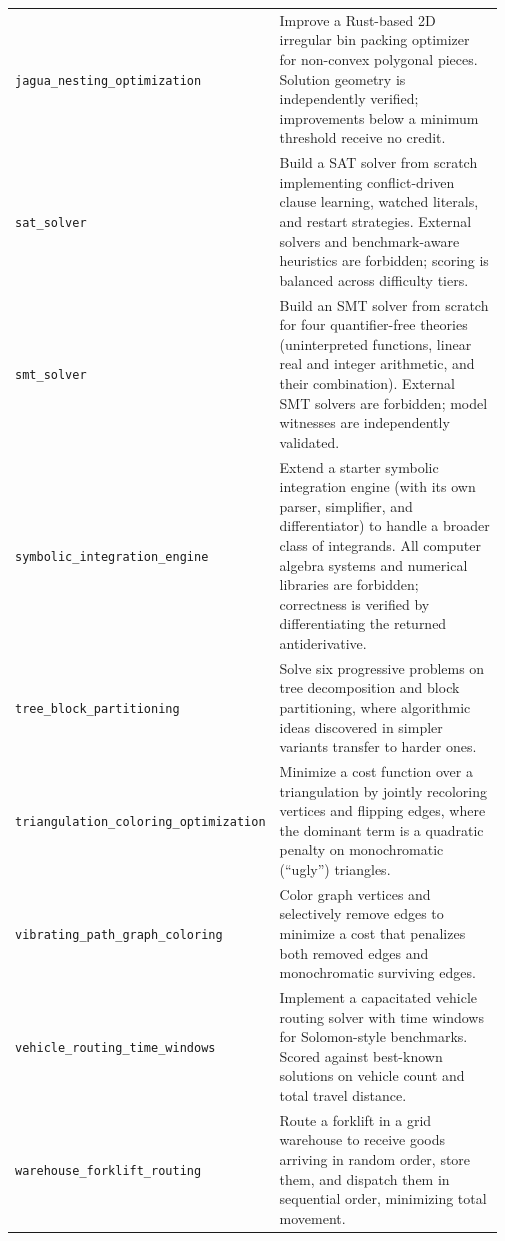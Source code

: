 \begin{longtable}{@{}>{\raggedright\arraybackslash}p{0.20\linewidth}>{\raggedright\arraybackslash}p{0.77\linewidth}@{}}
\tasknoterule
\texttt{jagua\_\allowbreak{}nesting\_\allowbreak{}optimization} & Improve a Rust-based 2D irregular bin packing optimizer for non-convex polygonal pieces. Solution geometry is independently verified; improvements below a minimum threshold receive no credit. \\
\tasknoterule
\texttt{sat\_\allowbreak{}solver} & Build a SAT solver from scratch implementing conflict-driven clause learning, watched literals, and restart strategies. External solvers and benchmark-aware heuristics are forbidden; scoring is balanced across difficulty tiers. \\
\tasknoterule
\texttt{smt\_\allowbreak{}solver} & Build an SMT solver from scratch for four quantifier-free theories (uninterpreted functions, linear real and integer arithmetic, and their combination). External SMT solvers are forbidden; model witnesses are independently validated. \\
\tasknoterule
\texttt{symbolic\_\allowbreak{}integration\_\allowbreak{}engine} & Extend a starter symbolic integration engine (with its own parser, simplifier, and differentiator) to handle a broader class of integrands. All computer algebra systems and numerical libraries are forbidden; correctness is verified by differentiating the returned antiderivative. \\
\tasknoterule
\texttt{tree\_\allowbreak{}block\_\allowbreak{}partitioning} & Solve six progressive problems on tree decomposition and block partitioning, where algorithmic ideas discovered in simpler variants transfer to harder ones. \\
\tasknoterule
\texttt{triangulation\_\allowbreak{}coloring\_\allowbreak{}optimization} & Minimize a cost function over a triangulation by jointly recoloring vertices and flipping edges, where the dominant term is a quadratic penalty on monochromatic (``ugly'') triangles. \\
\tasknoterule
\texttt{vibrating\_\allowbreak{}path\_\allowbreak{}graph\_\allowbreak{}coloring} & Color graph vertices and selectively remove edges to minimize a cost that penalizes both removed edges and monochromatic surviving edges. \\
\tasknoterule
\texttt{vehicle\_\allowbreak{}routing\_\allowbreak{}time\_\allowbreak{}windows} & Implement a capacitated vehicle routing solver with time windows for Solomon-style benchmarks. Scored against best-known solutions on vehicle count and total travel distance. \\
\tasknoterule
\texttt{warehouse\_\allowbreak{}forklift\_\allowbreak{}routing} & Route a forklift in a grid warehouse to receive goods arriving in random order, store them, and dispatch them in sequential order, minimizing total movement. \\

\end{longtable}
